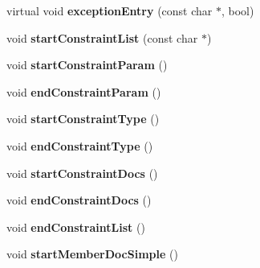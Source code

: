 \begin{DoxyCompactItemize}
\item 
\hypertarget{class_html_generator_afe0983cd10a7702e0bf3c3596b9f7b87}{virtual void {\bfseries exception\-Entry} (const char $\ast$, bool)}\label{class_html_generator_afe0983cd10a7702e0bf3c3596b9f7b87}

\item 
\hypertarget{class_html_generator_afe53ac5dd11e37006dd610540fc634a2}{void {\bfseries start\-Constraint\-List} (const char $\ast$)}\label{class_html_generator_afe53ac5dd11e37006dd610540fc634a2}

\item 
\hypertarget{class_html_generator_afd7a8f4d6caba86120db8bff0fa37422}{void {\bfseries start\-Constraint\-Param} ()}\label{class_html_generator_afd7a8f4d6caba86120db8bff0fa37422}

\item 
\hypertarget{class_html_generator_a01ad4ae7d141c58991b7a9575a67b6cb}{void {\bfseries end\-Constraint\-Param} ()}\label{class_html_generator_a01ad4ae7d141c58991b7a9575a67b6cb}

\item 
\hypertarget{class_html_generator_a6cb814426440dc7cc3d419d38b2e7d9b}{void {\bfseries start\-Constraint\-Type} ()}\label{class_html_generator_a6cb814426440dc7cc3d419d38b2e7d9b}

\item 
\hypertarget{class_html_generator_aa1459dd03b28f1af11a8b2a2a59339b2}{void {\bfseries end\-Constraint\-Type} ()}\label{class_html_generator_aa1459dd03b28f1af11a8b2a2a59339b2}

\item 
\hypertarget{class_html_generator_a8656767d36d6246287ba0c6697a66663}{void {\bfseries start\-Constraint\-Docs} ()}\label{class_html_generator_a8656767d36d6246287ba0c6697a66663}

\item 
\hypertarget{class_html_generator_aa25401ec889debd3be29cab509260442}{void {\bfseries end\-Constraint\-Docs} ()}\label{class_html_generator_aa25401ec889debd3be29cab509260442}

\item 
\hypertarget{class_html_generator_a3933f6db5a43b8de6b152d9c525bfde9}{void {\bfseries end\-Constraint\-List} ()}\label{class_html_generator_a3933f6db5a43b8de6b152d9c525bfde9}

\item 
\hypertarget{class_html_generator_af817990b78bf9afa5a2ef48400c3a688}{void {\bfseries start\-Member\-Doc\-Simple} ()}\label{class_html_generator_af817990b78bf9afa5a2ef48400c3a688}


\end{DoxyCompactItemize}
